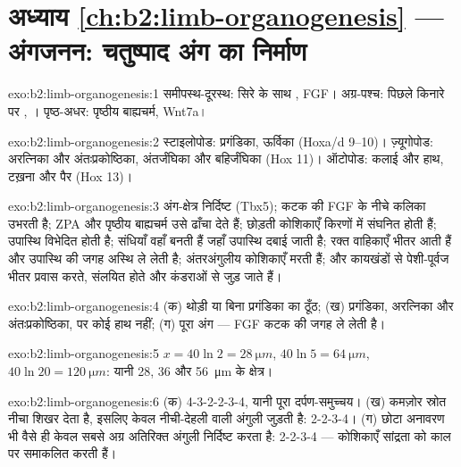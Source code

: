 \section*{अध्याय \ref{ch:b2:limb-organogenesis} --- अंगजनन: चतुष्पाद अंग का निर्माण}

\begin{solution}{exo:b2:limb-organogenesis:1}
समीपस्थ-दूरस्थ: सिरे के साथ , FGF।
अग्र-पश्च: पिछले किनारे पर ,
। पृष्ठ-अधर: पृष्ठीय बाह्यचर्म, Wnt7a।
\end{solution}

\begin{solution}{exo:b2:limb-organogenesis:2}
स्टाइलोपोड: प्रगंडिका, ऊर्विका (Hoxa/d 9--10)। ज़्यूगोपोड: अरत्निका और
अंतःप्रकोष्ठिका, अंतर्जंघिका और बहिर्जंघिका (Hox 11)। ऑटोपोड: कलाई और
हाथ, टख़ना और पैर (Hox 13)।
\end{solution}

\begin{solution}{exo:b2:limb-organogenesis:3}
अंग-क्षेत्र निर्दिष्ट (Tbx5); कटक की FGF के नीचे कलिका उभरती है;
ZPA और पृष्ठीय बाह्यचर्म उसे ढाँचा देते हैं;  छोड़ती
कोशिकाएँ किरणों में संघनित होती हैं; उपास्थि विभेदित होती है; संधियाँ
वहाँ बनती हैं जहाँ उपास्थि दबाई जाती है; रक्त वाहिकाएँ भीतर आती हैं और
उपास्थि की जगह अस्थि ले लेती है; अंतरअंगुलीय कोशिकाएँ मरती हैं; और
कायखंडों से पेशी-पूर्वज भीतर प्रवास करते, संलयित होते और कंडराओं से जुड़ जाते हैं।
\end{solution}

\begin{solution}{exo:b2:limb-organogenesis:4}
(क) थोड़ी या बिना प्रगंडिका का ठूँठ; (ख) प्रगंडिका, अरत्निका और
अंतःप्रकोष्ठिका, पर कोई हाथ नहीं; (ग) पूरा अंग --- FGF कटक की जगह ले लेती है।
\end{solution}

\begin{solution}{exo:b2:limb-organogenesis:5}
$x = 40\ln 2 = \qty{28}{\micro m}$, $40\ln 5 = \qty{64}{\micro m}$,
$40\ln 20 = \qty{120}{\micro m}$: यानी 28, 36 और
\qty{56}{\micro m} के क्षेत्र।
\end{solution}

\begin{solution}{exo:b2:limb-organogenesis:6}
(क) 4-3-2-2-3-4, यानी पूरा दर्पण-समुच्चय। (ख) कमज़ोर स्रोत
नीचा शिखर देता है, इसलिए केवल नीची-देहली वाली अंगुली जुड़ती है: 2-2-3-4। (ग)
छोटा अनावरण भी वैसे ही केवल सबसे अग्र अतिरिक्त
अंगुली निर्दिष्ट करता है: 2-2-3-4 --- कोशिकाएँ सांद्रता को काल पर समाकलित करती हैं।
\end{solution}

